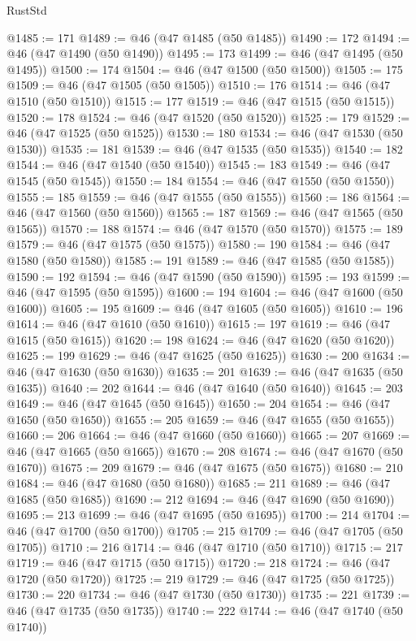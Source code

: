 \begin{lexlean}{RustStd}
\begin{coremodule}
{\begin{coremodule}
{{{{{{{{{{{{{{@1485 := 171
@1489 := @46 (@47 @1485 (@50 @1485))
@1490 := 172
@1494 := @46 (@47 @1490 (@50 @1490))
@1495 := 173
@1499 := @46 (@47 @1495 (@50 @1495))
@1500 := 174
@1504 := @46 (@47 @1500 (@50 @1500))
@1505 := 175
@1509 := @46 (@47 @1505 (@50 @1505))
@1510 := 176
@1514 := @46 (@47 @1510 (@50 @1510))
@1515 := 177
@1519 := @46 (@47 @1515 (@50 @1515))
@1520 := 178
@1524 := @46 (@47 @1520 (@50 @1520))
@1525 := 179
@1529 := @46 (@47 @1525 (@50 @1525))
@1530 := 180
@1534 := @46 (@47 @1530 (@50 @1530))
@1535 := 181
@1539 := @46 (@47 @1535 (@50 @1535))
@1540 := 182
@1544 := @46 (@47 @1540 (@50 @1540))
@1545 := 183
@1549 := @46 (@47 @1545 (@50 @1545))
@1550 := 184
@1554 := @46 (@47 @1550 (@50 @1550))
@1555 := 185
@1559 := @46 (@47 @1555 (@50 @1555))
@1560 := 186
@1564 := @46 (@47 @1560 (@50 @1560))
@1565 := 187
@1569 := @46 (@47 @1565 (@50 @1565))
@1570 := 188
@1574 := @46 (@47 @1570 (@50 @1570))
@1575 := 189
@1579 := @46 (@47 @1575 (@50 @1575))
@1580 := 190
@1584 := @46 (@47 @1580 (@50 @1580))
@1585 := 191
@1589 := @46 (@47 @1585 (@50 @1585))
@1590 := 192
@1594 := @46 (@47 @1590 (@50 @1590))
@1595 := 193
@1599 := @46 (@47 @1595 (@50 @1595))
@1600 := 194
@1604 := @46 (@47 @1600 (@50 @1600))
@1605 := 195
@1609 := @46 (@47 @1605 (@50 @1605))
@1610 := 196
@1614 := @46 (@47 @1610 (@50 @1610))
@1615 := 197
@1619 := @46 (@47 @1615 (@50 @1615))
@1620 := 198
@1624 := @46 (@47 @1620 (@50 @1620))
@1625 := 199
@1629 := @46 (@47 @1625 (@50 @1625))
@1630 := 200
@1634 := @46 (@47 @1630 (@50 @1630))
@1635 := 201
@1639 := @46 (@47 @1635 (@50 @1635))
@1640 := 202
@1644 := @46 (@47 @1640 (@50 @1640))
@1645 := 203
@1649 := @46 (@47 @1645 (@50 @1645))
@1650 := 204
@1654 := @46 (@47 @1650 (@50 @1650))
@1655 := 205
@1659 := @46 (@47 @1655 (@50 @1655))
@1660 := 206
@1664 := @46 (@47 @1660 (@50 @1660))
@1665 := 207
@1669 := @46 (@47 @1665 (@50 @1665))
@1670 := 208
@1674 := @46 (@47 @1670 (@50 @1670))
@1675 := 209
@1679 := @46 (@47 @1675 (@50 @1675))
@1680 := 210
@1684 := @46 (@47 @1680 (@50 @1680))
@1685 := 211
@1689 := @46 (@47 @1685 (@50 @1685))
@1690 := 212
@1694 := @46 (@47 @1690 (@50 @1690))
@1695 := 213
@1699 := @46 (@47 @1695 (@50 @1695))
@1700 := 214
@1704 := @46 (@47 @1700 (@50 @1700))
@1705 := 215
@1709 := @46 (@47 @1705 (@50 @1705))
@1710 := 216
@1714 := @46 (@47 @1710 (@50 @1710))
@1715 := 217
@1719 := @46 (@47 @1715 (@50 @1715))
@1720 := 218
@1724 := @46 (@47 @1720 (@50 @1720))
@1725 := 219
@1729 := @46 (@47 @1725 (@50 @1725))
@1730 := 220
@1734 := @46 (@47 @1730 (@50 @1730))
@1735 := 221
@1739 := @46 (@47 @1735 (@50 @1735))
@1740 := 222
@1744 := @46 (@47 @1740 (@50 @1740))
}}}}}}}}}}}}}}
\end{coremodule}}
\end{coremodule}
\end{lexlean}
